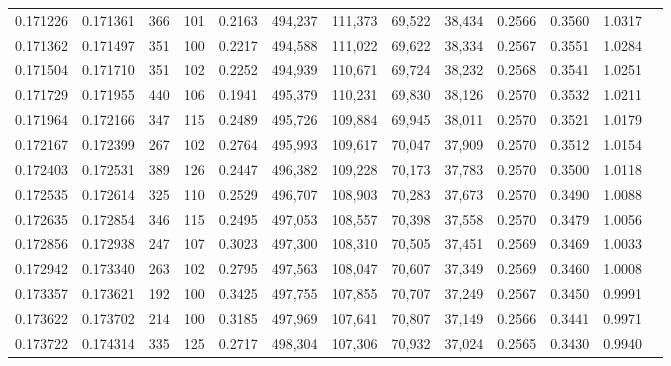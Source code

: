 \begin{tabular}{rrrrrrrrrrrrr}
0.171226 & 0.171361 &   366 & 101 &                                     0.2163 & 494,237 & 111,373 &  69,522 &  38,434 & 0.2566 & 0.3560 & 1.0317 \\
0.171362 & 0.171497 &   351 & 100 &                                     0.2217 & 494,588 & 111,022 &  69,622 &  38,334 & 0.2567 & 0.3551 & 1.0284 \\
0.171504 & 0.171710 &   351 & 102 &                                     0.2252 & 494,939 & 110,671 &  69,724 &  38,232 & 0.2568 & 0.3541 & 1.0251 \\
0.171729 & 0.171955 &   440 & 106 &                                     0.1941 & 495,379 & 110,231 &  69,830 &  38,126 & 0.2570 & 0.3532 & 1.0211 \\
0.171964 & 0.172166 &   347 & 115 &                                     0.2489 & 495,726 & 109,884 &  69,945 &  38,011 & 0.2570 & 0.3521 & 1.0179 \\
0.172167 & 0.172399 &   267 & 102 &                                     0.2764 & 495,993 & 109,617 &  70,047 &  37,909 & 0.2570 & 0.3512 & 1.0154 \\
0.172403 & 0.172531 &   389 & 126 &                                     0.2447 & 496,382 & 109,228 &  70,173 &  37,783 & 0.2570 & 0.3500 & 1.0118 \\
0.172535 & 0.172614 &   325 & 110 &                                     0.2529 & 496,707 & 108,903 &  70,283 &  37,673 & 0.2570 & 0.3490 & 1.0088 \\
0.172635 & 0.172854 &   346 & 115 &                                     0.2495 & 497,053 & 108,557 &  70,398 &  37,558 & 0.2570 & 0.3479 & 1.0056 \\
0.172856 & 0.172938 &   247 & 107 &                                     0.3023 & 497,300 & 108,310 &  70,505 &  37,451 & 0.2569 & 0.3469 & 1.0033 \\
0.172942 & 0.173340 &   263 & 102 &                                     0.2795 & 497,563 & 108,047 &  70,607 &  37,349 & 0.2569 & 0.3460 & 1.0008 \\
0.173357 & 0.173621 &   192 & 100 &                                     0.3425 & 497,755 & 107,855 &  70,707 &  37,249 & 0.2567 & 0.3450 & 0.9991 \\
0.173622 & 0.173702 &   214 & 100 &                                     0.3185 & 497,969 & 107,641 &  70,807 &  37,149 & 0.2566 & 0.3441 & 0.9971 \\
0.173722 & 0.174314 &   335 & 125 &                                     0.2717 & 498,304 & 107,306 &  70,932 &  37,024 & 0.2565 & 0.3430 & 0.9940 \\

\end{tabular}
